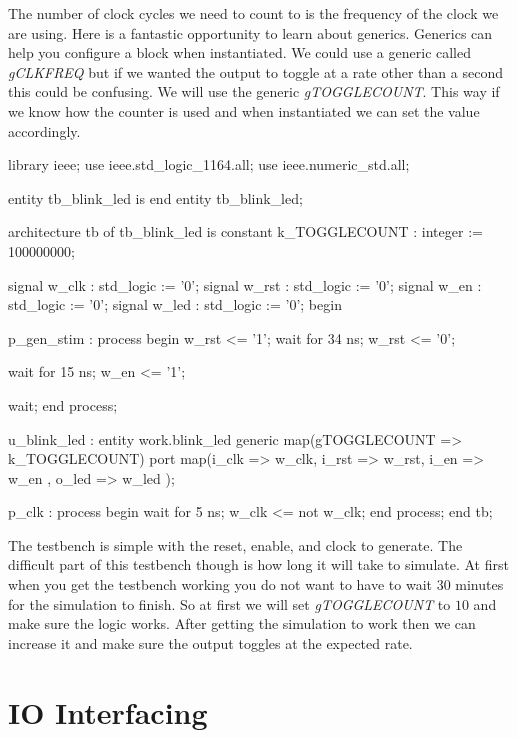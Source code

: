 The number of clock cycles we need to count to is the frequency of the clock we are using. Here is a fantastic opportunity to learn about generics. Generics can help you configure a block when instantiated. We could use a generic called \emph{gCLKFREQ} but if we wanted the output to toggle at a rate other than a second this could be confusing. We will use the generic \emph{gTOGGLECOUNT}. This way if we know how the counter is used and when instantiated we can set the value accordingly.
	
\begin{VHDLlisting}[tabsize=8]
library ieee;
  use ieee.std_logic_1164.all;
  use ieee.numeric_std.all;
  
entity tb_blink_led is
end entity tb_blink_led;

architecture tb of tb_blink_led is
    constant k_TOGGLECOUNT : integer := 100000000;

    signal w_clk : std_logic := '0';
    signal w_rst : std_logic := '0';
    signal w_en  : std_logic := '0';
    signal w_led : std_logic := '0';
begin

    p_gen_stim : process
    begin
        w_rst <= '1';
        wait for 34 ns;
        w_rst <= '0';
		
        wait for 15 ns;
        w_en <= '1';
		
        wait;
    end process;

    u_blink_led : entity work.blink_led
    generic map(gTOGGLECOUNT => k_TOGGLECOUNT)
    port map(i_clk   => w_clk,
             i_rst   => w_rst,
             i_en    => w_en ,
             o_led   => w_led
    );

    p_clk : process
    begin
        wait for 5 ns;
        w_clk <= not w_clk;
    end process;	
end tb;
\end{VHDLlisting}

The testbench is simple with the reset, enable, and clock to generate. The difficult part of this testbench though is how long it will take to simulate. At first when you get the testbench working you do not want to have to wait $30$ minutes for the simulation to finish. So at first we will set \emph{gTOGGLECOUNT} to $10$ and make sure the logic works. After getting the simulation to work then we can increase it and make sure the output toggles at the expected rate. 

\section{IO Interfacing}
	
